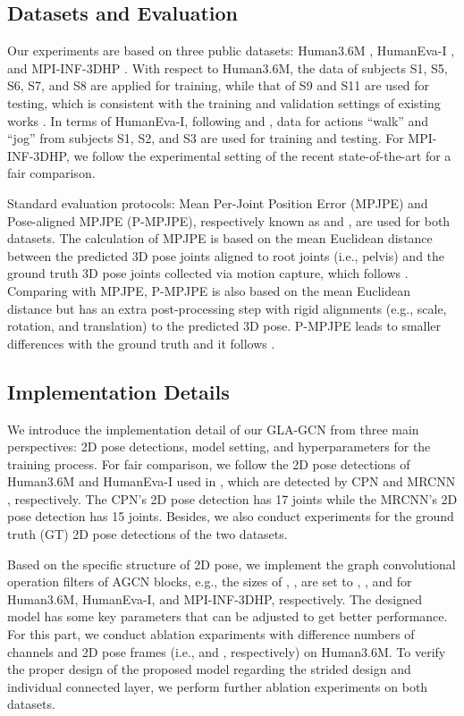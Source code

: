 \documentclass[10pt,twocolumn,letterpaper]{article}
\begin{document}
\subsection{Datasets and Evaluation}
Our experiments are based on three public datasets: Human3.6M \cite{RN025}, HumanEva-I \cite{RN033}, and MPI-INF-3DHP \cite{mehta2017monocular}. With respect to Human3.6M, the data of subjects S1, S5, S6, S7, and S8 are applied for training, while that of S9 and S11 are used for testing, which is consistent with the training and validation settings of existing works \cite{RN012,RN013,RN018,RN014}. In terms of HumanEva-I, following \cite{RN011} and \cite{RN013}, data for actions “walk” and “jog” from subjects S1, S2, and S3 are used for training and testing. For MPI-INF-3DHP, we follow the experimental setting of the recent state-of-the-art \cite{shan2022p} for a fair comparison. 

Standard evaluation protocols: Mean Per-Joint Position Error (MPJPE) and Pose-aligned MPJPE (P-MPJPE), respectively known as  and , are used for both datasets. The calculation of MPJPE is based on the mean Euclidean distance between the predicted 3D pose joints aligned to root joints (i.e., pelvis) and the ground truth 3D pose joints collected via motion capture, which follows \cite{zhou2016sparseness,tekin2016direct, RN009}. Comparing with MPJPE, P-MPJPE is also based on the mean  Euclidean distance but has an extra post-processing step with rigid alignments (e.g., scale, rotation, and translation) to the predicted 3D pose. P-MPJPE leads to smaller differences with the ground truth and it follows \cite{RN011, hossain2018exploiting,fang2018learning}. 

\subsection{Implementation Details}
We introduce the implementation detail of our GLA-GCN from three main perspectives: 2D pose detections, model setting, and hyperparameters for the training process. For fair comparison, we follow the 2D pose detections of Human3.6M \cite{RN025} and HumanEva-I \cite{RN033} used in \cite{RN012,RN013}, which are detected by CPN \cite{RN005} and MRCNN \cite{RN004}, respectively. The CPN's 2D pose detection has 17 joints while the MRCNN's 2D pose detection has 15 joints. Besides, we also conduct experiments for the ground truth (GT) 2D pose detections of the two datasets.

Based on the specific structure of 2D pose, we implement the graph convolutional operation filters of AGCN blocks,  e.g., the sizes of , ,  are set to , ,  and  for Human3.6M, HumanEva-I, and MPI-INF-3DHP, respectively. The designed model has some key parameters that can be adjusted to get better performance. For this part, we conduct ablation expariments with difference numbers of channels and 2D pose frames (i.e.,  and , respectively) on Human3.6M. To verify the proper design of the proposed model regarding the strided design and individual connected layer, we perform further ablation experiments on both datasets.
\end{document}
